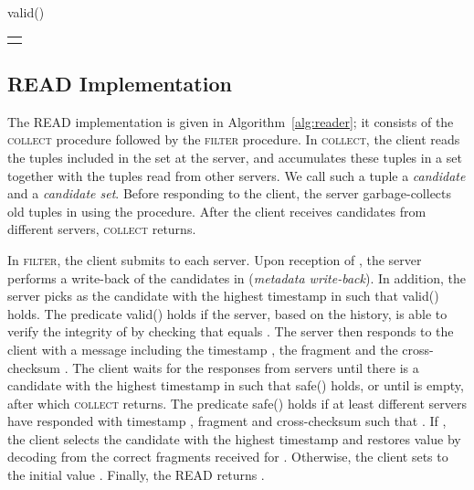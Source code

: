 \documentclass[10pt,conference,compsocconf]{IEEEtran}
\newcommand{\protocol}{PoWerStore}
\begin{document}
\begin{algo*}[t]
\begin{minipage}[t]{0.5\textwidth}
\begin{distribalgo}[1]
\medskip
{}
\STATE \textsf{valid}()  \label{alg:server:valid-pred}
\ENDINDENT

\setcounter{alg:client1:lines}{\value{ALC@line}}
\end{distribalgo}

\end{minipage}

\medskip
\begin{tabular}{c}\hline\mbox{}\hspace{0.97\textwidth}\mbox{}\end{tabular}

\caption{{Algorithm of server  in \protocol.}}\label{alg:server}
\end{algo*}



\subsection{\textsc{READ} Implementation}

The \textsc{READ} implementation is given in Algorithm~\ref{alg:reader}; it consists of the \textsc{collect} procedure followed by the \textsc{filter} procedure. In \textsc{collect}, the client reads the tuples  included in the set  at the server, and accumulates these tuples in a set  together with the tuples read from other servers. We call such a tuple a \emph{candidate} and  a \emph{candidate set}. Before responding to the client, the server garbage-collects old tuples in  using the  procedure. After the client receives candidates from  different servers, \textsc{collect} returns.

In \textsc{filter}, the client submits  to each server. Upon reception of , the server performs a write-back of the candidates in  (\emph{metadata write-back}). In addition, the server picks  as the candidate with the highest timestamp in  such that \textsf{valid}() holds. The predicate \textsf{valid}() holds if the server, based on the history, is able to verify the integrity of  by checking that  equals . The server then responds to the client with a message including the timestamp , the fragment  and the cross-checksum . The client waits for the responses from servers until there is a candidate  with the highest timestamp in  such that \textsf{safe}() holds, or until  is empty, after which \textsc{collect} returns. The predicate \textsf{safe}() holds if at least  different servers  have responded with timestamp , fragment  and cross-checksum  such that . If , the client selects the candidate with the highest timestamp  and restores value  by decoding  from the  correct fragments received for . Otherwise, the client sets  to the initial value . Finally, the \textsc{READ} returns .
\end{document}
